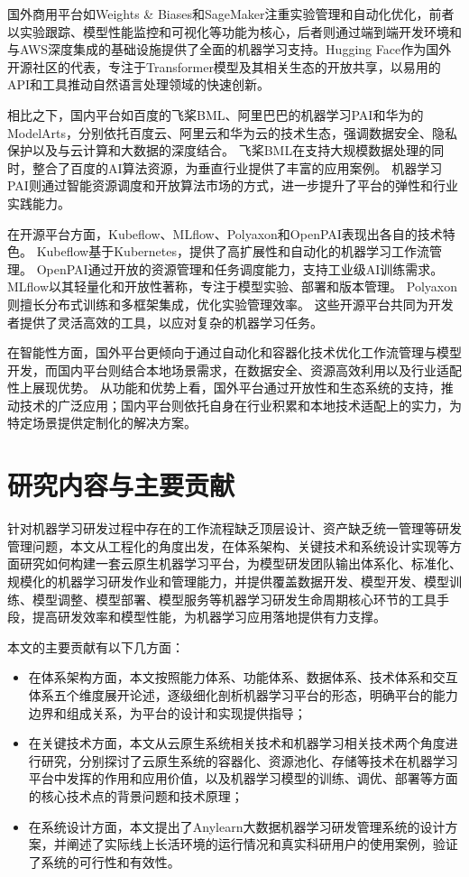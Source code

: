 国外商用平台如Weights \& Biases和SageMaker注重实验管理和自动化优化，前者以实验跟踪、模型性能监控和可视化等功能为核心，后者则通过端到端开发环境和与AWS深度集成的基础设施提供了全面的机器学习支持。Hugging Face作为国外开源社区的代表，专注于Transformer模型及其相关生态的开放共享，以易用的API和工具推动自然语言处理领域的快速创新。

相比之下，国内平台如百度的飞桨BML、阿里巴巴的机器学习PAI和华为的ModelArts，分别依托百度云、阿里云和华为云的技术生态，强调数据安全、隐私保护以及与云计算和大数据的深度结合。
飞桨BML在支持大规模数据处理的同时，整合了百度的AI算法资源，为垂直行业提供了丰富的应用案例。
机器学习PAI则通过智能资源调度和开放算法市场的方式，进一步提升了平台的弹性和行业实践能力。

在开源平台方面，Kubeflow、MLflow、Polyaxon和OpenPAI表现出各自的技术特色。
Kubeflow基于Kubernetes，提供了高扩展性和自动化的机器学习工作流管理。
OpenPAI通过开放的资源管理和任务调度能力，支持工业级AI训练需求。
MLflow以其轻量化和开放性著称，专注于模型实验、部署和版本管理。
Polyaxon则擅长分布式训练和多框架集成，优化实验管理效率。
这些开源平台共同为开发者提供了灵活高效的工具，以应对复杂的机器学习任务。

在智能性方面，国外平台更倾向于通过自动化和容器化技术优化工作流管理与模型开发，而国内平台则结合本地场景需求，在数据安全、资源高效利用以及行业适配性上展现优势。
从功能和优势上看，国外平台通过开放性和生态系统的支持，推动技术的广泛应用；国内平台则依托自身在行业积累和本地技术适配上的实力，为特定场景提供定制化的解决方案。


%
\section{研究内容与主要贡献}

针对机器学习研发过程中存在的工作流程缺乏顶层设计、资产缺乏统一管理等研发管理问题，本文从工程化的角度出发，在体系架构、关键技术和系统设计实现等方面研究如何构建一套云原生机器学习平台，为模型研发团队输出体系化、标准化、规模化的机器学习研发作业和管理能力，并提供覆盖数据开发、模型开发、模型训练、模型调整、模型部署、模型服务等机器学习研发生命周期核心环节的工具手段，提高研发效率和模型性能，为机器学习应用落地提供有力支撑。

本文的主要贡献有以下几方面：
\begin{itemize}
  \item 在体系架构方面，本文按照能力体系、功能体系、数据体系、技术体系和交互体系五个维度展开论述，逐级细化剖析机器学习平台的形态，明确平台的能力边界和组成关系，为平台的设计和实现提供指导；
  \item 在关键技术方面，本文从云原生系统相关技术和机器学习相关技术两个角度进行研究，分别探讨了云原生系统的容器化、资源池化、存储等技术在机器学习平台中发挥的作用和应用价值，以及机器学习模型的训练、调优、部署等方面的核心技术点的背景问题和技术原理；
  \item 在系统设计方面，本文提出了Anylearn大数据机器学习研发管理系统的设计方案，并阐述了实际线上长活环境的运行情况和真实科研用户的使用案例，验证了系统的可行性和有效性。
\end{itemize}


